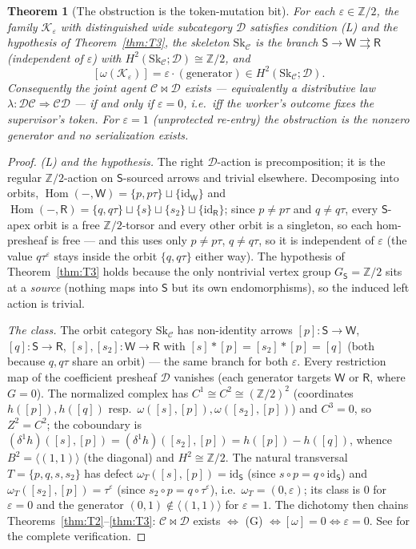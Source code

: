 \documentclass[11pt]{amsart}
\newtheorem{theorem}{Theorem}[section]
\theoremstyle{definition}
\theoremstyle{remark}
\newcommand{\Hom}{\operatorname{Hom}}
\newcommand{\id}{\mathrm{id}}
\newcommand{\C}{\mathcal{C}}
\newcommand{\D}{\mathcal{D}}
\newcommand{\K}{\mathcal{K}}
\newcommand{\Sk}{\mathrm{Sk}}
\newcommand{\Sup}{\mathsf{S}}
\newcommand{\Wk}{\mathsf{W}}
\newcommand{\Rt}{\mathsf{R}}
\newcommand{\dir}{\mathcal{D}}
\begin{document}
\begin{theorem}[The obstruction is the token-mutation bit]\label{thm:h2}
For each $\varepsilon\in\mathbb Z/2$, the family $\K_\varepsilon$ with distinguished wide
subcategory $\D$ satisfies condition \textnormal{(L)} and the hypothesis of
Theorem~\ref{thm:T3}, the skeleton $\Sk_\C$ is the branch $\Sup\to\Wk\rightrightarrows\Rt$
(independent of $\varepsilon$) with $H^2(\Sk_\C;\dir)\cong\mathbb Z/2$, and
\[
  [\omega(\K_\varepsilon)]=\varepsilon\cdot(\text{generator})\in H^2(\Sk_\C;\dir).
\]
Consequently the joint agent $\C\bowtie\D$ exists --- equivalently a distributive law
$\lambda:\D\C\Rightarrow\C\D$ --- \emph{if and only if $\varepsilon=0$, i.e.\ iff the worker's
outcome fixes the supervisor's token.} For $\varepsilon=1$ (unprotected re-entry) the
obstruction is the nonzero generator and no serialization exists.
\end{theorem}

\begin{proof}
\emph{(L) and the hypothesis.} The right $\D$-action is precomposition; it is the regular
$\mathbb Z/2$-action on $\Sup$-sourced arrows and trivial elsewhere. Decomposing into orbits,
$\Hom(-,\Wk)=\{p,p\tau\}\sqcup\{\id_\Wk\}$ and
$\Hom(-,\Rt)=\{q,q\tau\}\sqcup\{s\}\sqcup\{s_2\}\sqcup\{\id_\Rt\}$; since $p\neq p\tau$ and
$q\neq q\tau$, every $\Sup$-apex orbit is a free $\mathbb Z/2$-torsor and every other orbit is a
singleton, so each hom-presheaf is free --- and this uses only $p\neq p\tau$, $q\neq q\tau$, so
it is independent of $\varepsilon$ (the value $q\tau^\varepsilon$ stays inside the orbit
$\{q,q\tau\}$ either way). The hypothesis of Theorem~\ref{thm:T3} holds because the only
nontrivial vertex group $G_\Sup=\mathbb Z/2$ sits at a \emph{source} (nothing maps into $\Sup$
but its own endomorphisms), so the induced left action is trivial.

\emph{The class.} The orbit category $\Sk_\C$ has non-identity arrows
$[p]:\Sup\to\Wk$, $[q]:\Sup\to\Rt$, $[s],[s_2]:\Wk\to\Rt$ with
$[s]\ast[p]=[s_2]\ast[p]=[q]$ (both because $q,q\tau$ share an orbit) --- the same branch for
both $\varepsilon$. Every restriction map of the coefficient presheaf $\dir$ vanishes (each
generator targets $\Wk$ or $\Rt$, where $G=0$). The normalized complex has
$C^1\cong C^2\cong(\mathbb Z/2)^2$ (coordinates $h([p]),h([q])$ resp.\
$\omega([s],[p]),\omega([s_2],[p])$) and $C^3=0$, so $Z^2=C^2$; the coboundary is
$(\delta^1 h)([s],[p])=(\delta^1 h)([s_2],[p])=h([p])-h([q])$, whence
$B^2=\langle(1,1)\rangle$ (the diagonal) and $H^2\cong\mathbb Z/2$. The natural transversal
$T=\{p,q,s,s_2\}$ has defect $\omega_T([s],[p])=\id_\Sup$ (since $s\circ p=q\circ\id_\Sup$) and
$\omega_T([s_2],[p])=\tau^\varepsilon$ (since $s_2\circ p=q\circ\tau^\varepsilon$), i.e.\
$\omega_T=(0,\varepsilon)$; its class is $0$ for $\varepsilon=0$ and the generator
$(0,1)\notin\langle(1,1)\rangle$ for $\varepsilon=1$. The dichotomy then chains
Theorems~\ref{thm:T2}--\ref{thm:T3}: $\C\bowtie\D$ exists $\iff$ (G) $\iff[\omega]=0\iff
\varepsilon=0$. See \cite{analytic} for the complete verification.
\end{proof}
\end{document}
